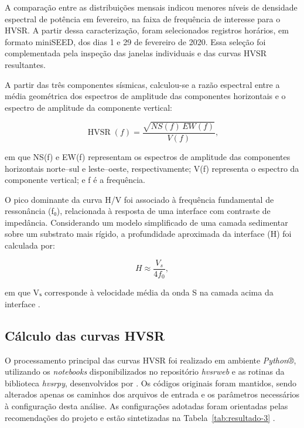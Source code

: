 A comparação entre as distribuições mensais indicou menores níveis de densidade espectral de potência em fevereiro, na faixa de frequência de interesse para o HVSR. A partir dessa caracterização, foram selecionados registros horários, em formato miniSEED, dos dias 1 e 29 de fevereiro de 2020. Essa seleção foi complementada pela inspeção das janelas individuais e das curvas HVSR resultantes.

A partir das três componentes sísmicas, calculou-se a razão espectral entre a média geométrica dos espectros de amplitude das componentes horizontais e o espectro de amplitude da componente vertical:

\begin{equation}
  \operatorname{HVSR}(f)=\frac{\sqrt{NS(f)\,EW(f)}}{V(f)},
  \label{eq:hvsr}
\end{equation}

\noindent
em que NS(f) e EW(f) representam os espectros de amplitude das componentes horizontais norte--sul e leste--oeste, respectivamente; V(f) representa o espectro da componente vertical; e f é a frequência.

O pico dominante da curva H/V foi associado à frequência fundamental de ressonância (f₀), relacionada à resposta de uma interface com contraste de impedância. Considerando um modelo simplificado de uma camada sedimentar sobre um substrato mais rígido, a profundidade aproximada da interface (H) foi calculada por:

\begin{equation}
  H\approx\frac{V_s}{4f_0},
  \label{eq:quarto-comprimento}
\end{equation}

\noindent
em que Vₛ corresponde à velocidade média da onda S na camada acima da interface \cite{nakamura1989,krylov2020}.

\subsection{Cálculo das curvas HVSR}\label{sec:4-6-1}

O processamento principal das curvas HVSR foi realizado em ambiente \textit{Python®}, utilizando os \textit{notebooks} disponibilizados no repositório \textit{hvsrweb} e as rotinas da biblioteca \textit{hvsrpy}, desenvolvidos por . Os códigos originais foram mantidos, sendo alterados apenas os caminhos dos arquivos de entrada e os parâmetros necessários à configuração desta análise. As configurações adotadas foram orientadas pelas recomendações do projeto  e estão sintetizadas na Tabela~\ref{tab:resultado-3} .

